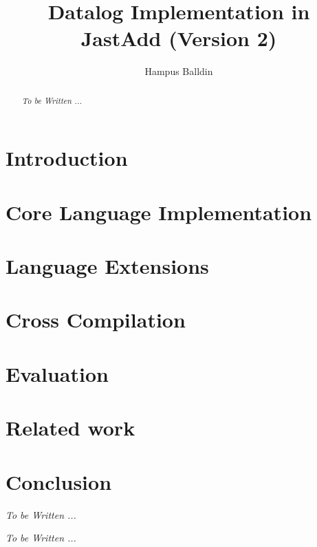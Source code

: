 \documentclass[sigplan,10pt]{acmart}
\begin{document}
\title[Short Title]{Datalog Implementation in JastAdd (Version 2)}         %



\author{Hampus Balldin}
\begin{abstract}
\textit{To be Written ... }
\end{abstract}
\maketitle
\section{Introduction}

\section{Core Language Implementation}

\section{Language Extensions}

\vspace*{-\baselineskip}
\newpage
\section{Cross Compilation}

\section{Evaluation}

\section{Related work}

\section{Conclusion}
\textit{To be Written ... }
\begin{acks}
\textit{To be Written ... }
\end{acks}



\end{document}
